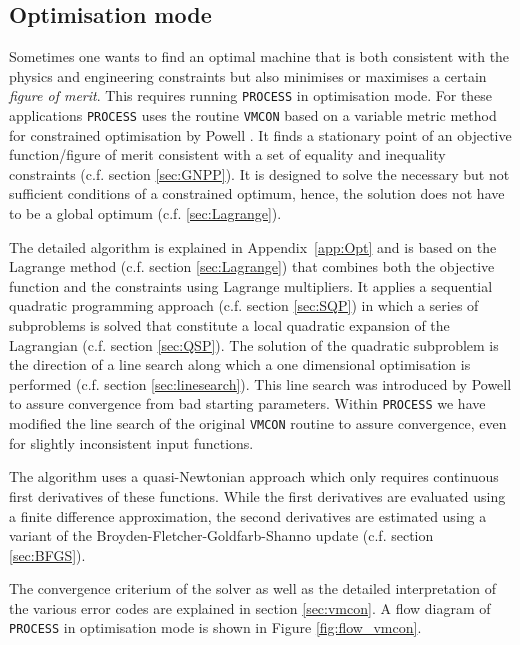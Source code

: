 \documentclass[11pt,a4paper]{report}
\newcommand{\process}{\mbox{\texttt{PROCESS}}}
\newcommand{\vmcon}{\mbox{\texttt{VMCON}}}
\begin{document}
\subsection{Optimisation mode}


Sometimes one wants to find an optimal machine that is both consistent with
the physics and engineering constraints but also minimises or maximises a
certain \textit{figure of merit}. This requires running \process\/ in
optimisation mode. For these applications \process\/ uses the routine \vmcon\/
\cite{vmcon} based on a variable metric method for constrained optimisation by
Powell \cite{Powell1978}. It finds a stationary point of an objective
function/figure of merit consistent with a set of equality and inequality
constraints (c.f. section \ref{sec:GNPP}). It is designed to solve the
necessary but not sufficient conditions of a constrained optimum, hence, the
solution does not have to be a global optimum (c.f. \ref{sec:Lagrange}).

The detailed algorithm is explained in Appendix~\ref{app:Opt} and is based on
the Lagrange method (c.f. section \ref{sec:Lagrange}) that combines both the
objective function and the constraints using Lagrange multipliers. It applies
a sequential quadratic programming approach (c.f. section \ref{sec:SQP}) in
which a series of subproblems is solved that constitute a local quadratic
expansion of the Lagrangian (c.f. section \ref{sec:QSP}). The solution of the
quadratic subproblem is the direction of a line search along which a one
dimensional optimisation is performed (c.f. section
\ref{sec:linesearch}). This line search was introduced by Powell to assure
convergence from bad starting parameters. Within \process\/ we have modified
the line search of the original \vmcon\/ routine to assure convergence, even
for slightly inconsistent input functions.

The algorithm uses a quasi-Newtonian approach which only requires continuous
first derivatives of these functions. While the first derivatives are
evaluated using a finite difference approximation, the second derivatives are
estimated using a variant of the Broyden-Fletcher-Goldfarb-Shanno update
(c.f. section \ref{sec:BFGS}).

The convergence criterium of the solver as well as the detailed interpretation
of the various error codes are explained in section \ref{sec:vmcon}. A flow
diagram of \process\/ in optimisation mode is shown in Figure
\ref{fig:flow_vmcon}.
\end{document}

